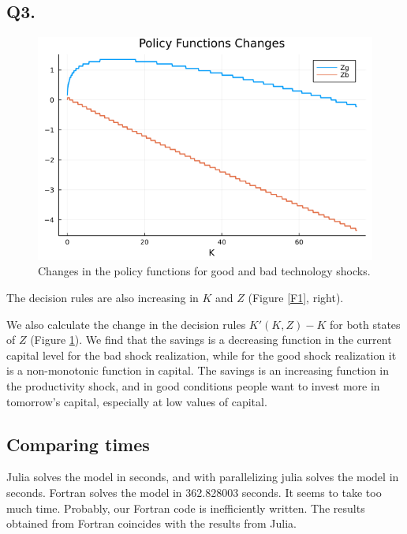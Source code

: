\documentclass[12pt]{article}
\begin{document}
\subsection*{Q3.}

\begin{figure}
    \centering
    \includegraphics[width = 0.5\linewidth]{pset1/figures/polfuncchanges.png}
        \caption{Changes in the policy functions for good and bad technology shocks.}
      \label{F2}
\end{figure}

 The decision rules are also increasing in $K$ and $Z$ (Figure \ref{F1}, right). 

We also calculate the change in the decision rules $K'(K,Z) - K$ for both states of $Z$ (Figure \ref{F2}). We find that the savings is a decreasing function in the current capital level for the bad shock realization, while for the good shock realization it is a non-monotonic function in capital. The savings is an increasing function in the productivity shock, and in good conditions people want to invest more in tomorrow's capital, especially at low values of capital. %

\subsection*{Comparing times}
Julia solves the model in  seconds, and with parallelizing julia solves the model in  seconds. Fortran solves the model in 362.828003 seconds. It seems to take too much time. Probably, our Fortran code is inefficiently written. The results obtained from Fortran coincides with the results from Julia.
\end{document}
